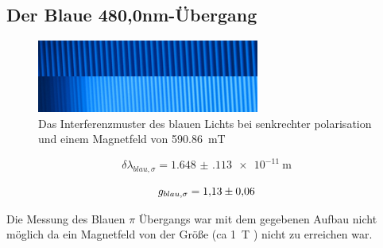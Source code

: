 \subsection{Der Blaue 480,0nm-Übergang}

\begin{figure}
    \center
    \includegraphics[width=0.65\textwidth]{bilder/bearbeitet/blau_senk.jpg}
    \caption{Das Interferenzmuster des blauen Lichts bei senkrechter polarisation und einem Magnetfeld von \SI{590,86}{\milli\tesla}}
    \label{fig:blau_senk}
\end{figure}

\begin{equation*}
    \delta \lambda_{blau,\sigma} = \SI{1.648(113) e-11}{\metre}
\end{equation*}

\begin{equation*}
    g_{blau,\sigma} = \num{1.13+-0.06}
\end{equation*}

Die Messung des Blauen $\pi$ Übergangs war mit dem gegebenen Aufbau nicht möglich da ein Magnetfeld von der Größe (ca \SI{1}{\tesla} ) nicht zu erreichen war.

